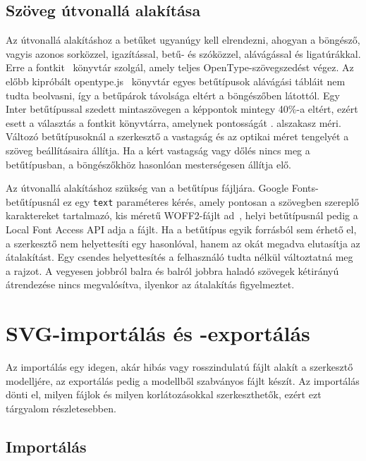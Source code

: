 \subsection{Szöveg útvonallá alakítása}

Az útvonallá alakításhoz a betűket ugyanúgy kell elrendezni, ahogyan a böngésző, vagyis azonos sorközzel, igazítással, betű- és szóközzel, alávágással és ligatúrákkal. Erre a fontkit~\cite{fontkit} könyvtár szolgál, amely teljes OpenType-szövegszedést végez. Az előbb kipróbált opentype.js~\cite{opentypejs} könyvtár egyes betűtípusok alávágási tábláit nem tudta beolvasni, így a betűpárok távolsága eltért a böngészőben látottól. Egy Inter betűtípussal szedett mintaszövegen a képpontok mintegy 40\%-a eltért, ezért esett a választás a fontkit könyvtárra, amelynek pontosságát . alszakasz méri. Változó betűtípusoknál a szerkesztő a vastagság és az optikai méret tengelyét a szöveg beállításaira állítja. Ha a kért vastagság vagy dőlés nincs meg a betűtípusban, a böngészőkhöz hasonlóan mesterségesen állítja elő.

Az útvonallá alakításhoz szükség van a betűtípus fájljára. Google Fonts-betűtípusnál ez egy \texttt{text} paraméteres kérés, amely pontosan a szövegben szereplő karaktereket tartalmazó, kis méretű WOFF2-fájlt ad~\cite{google-fonts-css2,w3c-woff2}, helyi betűtípusnál pedig a Local Font Access API adja a fájlt. Ha a betűtípus egyik forrásból sem érhető el, a szerkesztő nem helyettesíti egy hasonlóval, hanem az okát megadva elutasítja az átalakítást. Egy csendes helyettesítés a felhasználó tudta nélkül változtatná meg a rajzot. A vegyesen jobbról balra és balról jobbra haladó szövegek kétirányú átrendezése nincs megvalósítva, ilyenkor az átalakítás figyelmeztet.

\section{SVG-importálás és -exportálás}
\label{sec:svg_io}

Az importálás egy idegen, akár hibás vagy rosszindulatú fájlt alakít a szerkesztő modelljére, az exportálás pedig a modellből szabványos fájlt készít. Az importálás dönti el, milyen fájlok és milyen korlátozásokkal szerkeszthetők, ezért ezt tárgyalom részletesebben.

\subsection{Importálás}

